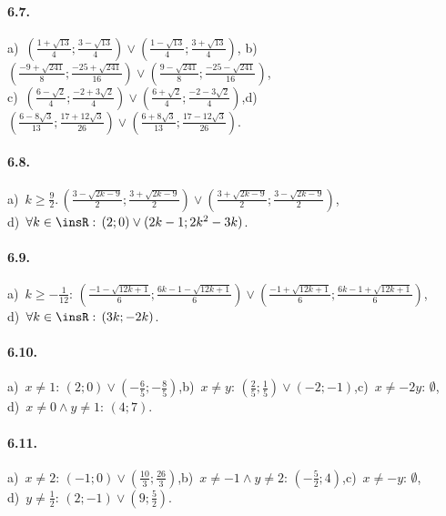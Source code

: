 \paragraph{6.7.} a)~$\left(\frac{1+\sqrt{13}} 4;\frac{3-\sqrt{13}} 4\right)\vee \left(\frac{1-\sqrt{13}} 4;\frac{3+\sqrt{13}} 4\right)$,\; b)~$\left(\frac{-9+\sqrt{241}} 8;\frac{-25+\sqrt{241}}{16}\right)\vee \left(\frac{9-\sqrt{241}} 8;\frac{-25-\sqrt{241}}{16}\right)$,\protect\\
c)~$\left(\frac{6-\sqrt 2} 4;\frac{-2+3\sqrt 2} 4\right)\vee \left(\frac{6+\sqrt 2} 4;\frac{-2-3\sqrt 2} 4\right)$,\quad d)~$\left(\frac{6-8\sqrt 3}{13};\frac{17+12\sqrt 3}{26}\right)\vee\left(\frac{6+ 8\sqrt 3}{13};\frac{17-12\sqrt 3}{26}\right)$.

\paragraph{6.8.} a)~$k\ge \frac 9 2.\, \left(\frac{3-\sqrt{2k-9}} 2; \frac{3+\sqrt{2k-9}} 2\right)\vee \left(\frac{3+\sqrt{2k-9}} 2; \frac{3-\sqrt{2k-9}} 2\right)$,\protect\\
\quad d)~$\forall k\in \insR:\, (2; 0)\vee (2k-1; 2k^2-3k)$.

\paragraph{6.9.} a)~$k\ge -\frac 1{12}:\, \left(\frac{-1-\sqrt{12k+1}} 6; \frac{6k-1-\sqrt{12k+1}} 6\right) \vee \left(\frac{-1+\sqrt{12k+1}} 6; \frac{6k-1+\sqrt{12k+1}} 6\right)$,\protect\\
\quad d)~$\forall k\in \insR:\, (3k; -2k)$.

\paragraph{6.10.} a)~$x\neq 1:\, \left(2;0\right)\vee \left(-\frac 6 5;-\frac 8 5\right)$,\quad b)~$x\neq y:\, \left(\frac 2 5;\frac 1 5\right)\vee \left(-2;-1\right)$,\quad c)~$x\neq -2y:\, \emptyset $,\protect\\
\quad d)~$x\neq 0\wedge y\neq 1:\, (4;7)$.

\paragraph{6.11.} a)~$x\neq 2:\, \left(-1;0\right)\vee \left(\frac{10} 3;\frac{26} 3\right)$,\quad b)~$x\neq -1\wedge y\neq 2:\, \left(-\frac 5 2;4\right)$,\quad c)~$x\neq -y:\, \emptyset $,\protect\\
\quad d)~$y\neq \frac 1 2:\, \left(2;-1\right)\vee \left(9;\frac 5 2\right)$.

